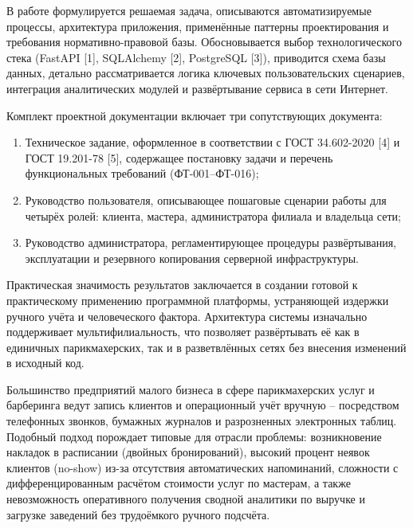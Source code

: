 В работе формулируется решаемая задача, описываются автоматизируемые
процессы, архитектура приложения, применённые паттерны проектирования и
требования нормативно-правовой базы. Обосновывается выбор
технологического стека (FastAPI [1], SQLAlchemy [2], PostgreSQL [3]),
приводится схема базы данных, детально рассматривается логика ключевых
пользовательских сценариев, интеграция аналитических модулей и
развёртывание сервиса в сети Интернет.

Комплект проектной документации включает три сопутствующих документа:

\begin{enumerate}
\item Техническое задание, оформленное в соответствии с
  ГОСТ 34.602-2020 [4] и ГОСТ 19.201-78 [5], содержащее постановку
  задачи и перечень функциональных требований (ФТ-001--ФТ-016);
\item Руководство пользователя, описывающее пошаговые сценарии работы
  для четырёх ролей: клиента, мастера, администратора филиала и
  владельца сети;
\item Руководство администратора, регламентирующее процедуры
  развёртывания, эксплуатации и резервного копирования серверной
  инфраструктуры.
\end{enumerate}

Практическая значимость результатов заключается в создании готовой к
практическому применению программной платформы, устраняющей издержки
ручного учёта и человеческого фактора. Архитектура системы изначально
поддерживает мультифилиальность, что позволяет развёртывать её как в
единичных парикмахерских, так и в разветвлённых сетях без внесения
изменений в исходный код.



Большинство предприятий малого бизнеса в сфере парикмахерских услуг и
барберинга ведут запись клиентов и операционный учёт вручную -- посредством
телефонных звонков, бумажных журналов и разрозненных электронных таблиц.
Подобный подход порождает типовые для отрасли проблемы: возникновение
накладок в расписании (двойных бронирований), высокий процент неявок
клиентов (no-show) из-за отсутствия автоматических напоминаний, сложности
с дифференцированным расчётом стоимости услуг по мастерам, а также
невозможность оперативного получения сводной аналитики по выручке и
загрузке заведений без трудоёмкого ручного подсчёта.

